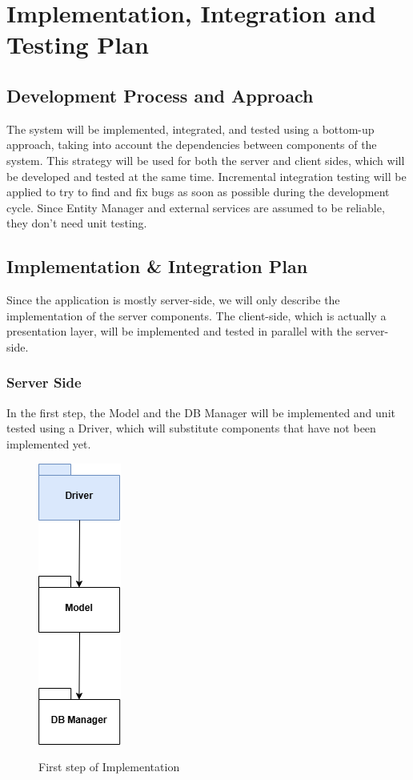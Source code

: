 \documentclass[a4paper,12pt]{article}
\begin{document}
\section{Implementation, Integration and Testing Plan}

\subsection{Development Process and Approach}
The system will be implemented, integrated, and tested using a bottom-up approach, taking
into account the dependencies between components of the system. This strategy will be used
for both the server and client sides, which will be developed and tested at the same time.
Incremental integration testing will be applied to try to find and fix bugs as soon as possible
during the development cycle. Since Entity Manager and external services are assumed to be
reliable, they don't need unit testing.
\subsection{Implementation \& Integration Plan}
Since the application is mostly server-side, we will only describe the implementation of
the server components. The client-side, which is actually a presentation layer, will be
implemented and tested in parallel with the server-side.
\subsubsection{Server Side}
In the first step, the Model and the DB Manager will be implemented and unit tested using a Driver, which will substitute components that have not been implemented yet.

\begin{figure}[H]
\centering
\includegraphics[scale = 0.78]{DD_figures/ImplementationDiagrams/FirstStep.png}\\
\caption{First step of Implementation}
\end{figure}
\newpage
\end{document}
